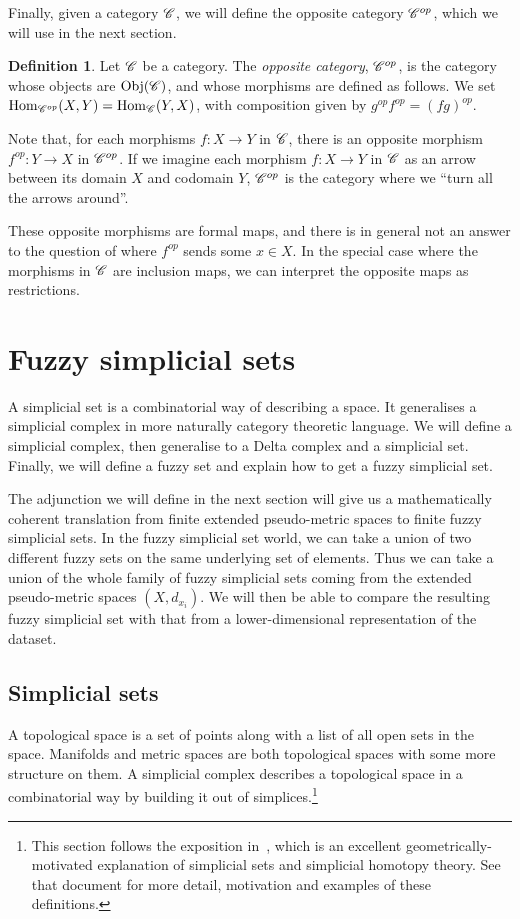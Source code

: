 \documentclass[a4paper,11pt,leqno]{article} \usepackage{amsmath}
\newcommand{\Hom}{\ensuremath{\operatorname{Hom}}}
\newcommand{\Obj}{\ensuremath{\operatorname{Obj}}}
\theoremstyle{definition}
\newtheorem{defn}{Definition}
\begin{document}
Finally, given a category $\mathscr{C}$, we will define the opposite category $\mathscr{C}^{op}$,
which we will use in the next section.
\begin{defn}
  Let $\mathscr{C}$ be a category.
  The \emph{opposite category}, $\mathscr{C}^{op}$, is the category whose objects are
  $\Obj(\curC)$, and whose morphisms are defined as follows.
  We set $\Hom_{\curC^{op}}(X, Y) = \Hom_{\curC}(Y, X)$, with composition given
  by $g^{op}f^{op} = (fg)^{op}$.
\end{defn}
Note that, for each morphisms $f: X\to Y$ in $\mathscr{C}$, there is an opposite
morphism $f^{op}: Y\to X$ in $\mathscr{C}^{op}$.
If we imagine each morphism $f: X\to Y$ in $\mathscr{C}$ as an arrow between its
domain $X$ and codomain $Y$, $\mathscr{C}^{op}$ is the category where we ``turn all
the arrows around''.

These opposite morphisms are formal maps, and there is in general not an answer
to the question of where $f^{op}$ sends some $x\in X$.
In the special case where the morphisms in $\mathscr{C}$ are inclusion maps, we can
interpret the opposite maps as restrictions.

\section{Fuzzy simplicial sets}
\label{section_fss}

A simplicial set is a combinatorial way of describing a space.
It generalises a simplicial complex in more naturally category theoretic
language.
We will define a simplicial complex, then generalise to a Delta complex and
a simplicial set.
Finally, we will define a fuzzy set and explain how to get a fuzzy simplicial
set.

The adjunction we will define in the next section will give us a mathematically
coherent translation from finite extended pseudo-metric spaces to finite fuzzy
simplicial sets.
In the fuzzy simplicial set world, we can take a union of two different fuzzy
sets on the same underlying set of elements.
Thus we can take a union of the whole family of fuzzy simplicial sets coming
from the extended pseudo-metric spaces $(X, d_{x_i})$.
We will then be able to compare the resulting fuzzy simplicial set with that
from a lower-dimensional representation of the dataset.

\subsection{Simplicial sets}

A topological space is a set of points along with a list of all open sets in
the space.
Manifolds and metric spaces are both topological spaces with some more
structure on them.
A simplicial complex describes a topological space in a combinatorial
way by building it out of simplices.\footnote{
  This section follows the exposition in~\cite{Friedman08}, which is an
  excellent geometrically-motivated explanation of simplicial sets and
  simplicial homotopy theory.
  See that document for more detail, motivation and examples of these
  definitions.
}
\end{document}
